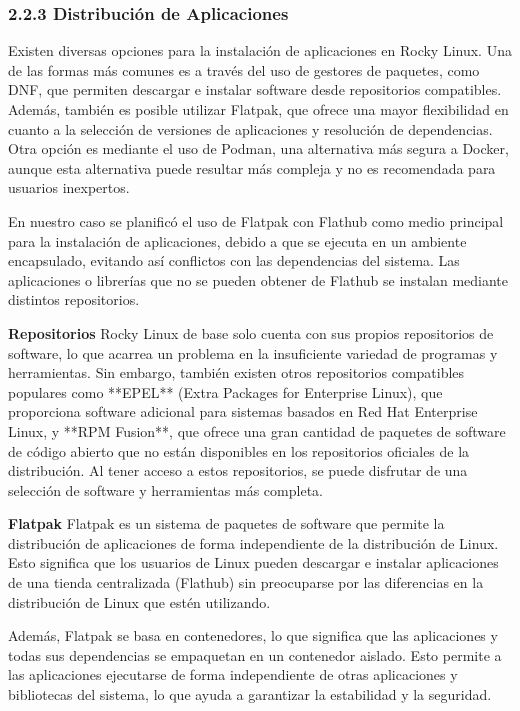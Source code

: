 \begin{doublespace}
\begin{multicols}{2}
    \subsubsection{2.2.3 Distribución de Aplicaciones}
    Existen diversas opciones para la instalación de aplicaciones en Rocky Linux. Una de las formas más comunes es a través del uso de gestores de paquetes, como DNF, que permiten descargar e instalar software desde repositorios compatibles. Además, también es posible utilizar Flatpak, que ofrece una mayor flexibilidad en cuanto a la selección de versiones de aplicaciones y resolución de dependencias. Otra opción es mediante el uso de Podman, una alternativa más segura a Docker, aunque esta alternativa puede resultar más compleja y no es recomendada para usuarios inexpertos.

    En nuestro caso se planificó el uso de Flatpak con Flathub como medio principal para la instalación de aplicaciones, debido a que se ejecuta en un ambiente encapsulado, evitando así conflictos con las dependencias del sistema. Las aplicaciones o librerías que no se pueden obtener de Flathub se instalan mediante distintos repositorios.

    \textbf{Repositorios}
    \newline
    Rocky Linux de base solo cuenta con sus propios repositorios de software, lo que acarrea un problema en la insuficiente variedad de programas y herramientas. Sin embargo, también existen otros repositorios compatibles populares como **EPEL** (Extra Packages for Enterprise Linux), que proporciona software adicional para sistemas basados en Red Hat Enterprise Linux, y **RPM Fusion**, que ofrece una gran cantidad de paquetes de software de código abierto que no están disponibles en los repositorios oficiales de la distribución. Al tener acceso a estos repositorios, se puede disfrutar de una selección de software y herramientas más completa. \cite{RL-repo-1} \cite{RHEL-EPEL-1} \cite{rpmfusion-1}

    \textbf{Flatpak}
    \newline
    Flatpak es un sistema de paquetes de software que permite la distribución de aplicaciones de forma independiente de la distribución de Linux. Esto significa que los usuarios de Linux pueden descargar e instalar aplicaciones de una tienda centralizada (Flathub) sin preocuparse por las diferencias en la distribución de Linux que estén utilizando.

    Además, Flatpak se basa en contenedores, lo que significa que las aplicaciones y todas sus dependencias se empaquetan en un contenedor aislado. Esto permite a las aplicaciones ejecutarse de forma independiente de otras aplicaciones y bibliotecas del sistema, lo que ayuda a garantizar la estabilidad y la seguridad.


\end{multicols}
\end{doublespace}
